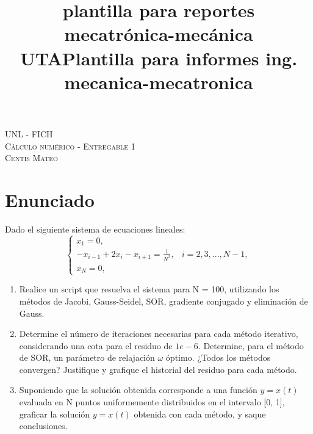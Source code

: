 \documentclass[11pt]{article}
\title{plantilla para reportes mecatrónica-mecánica UTA}
\title{Plantilla para informes ing. mecanica-mecatronica}
\begin{document}

\begin{center}																		%
	\newcommand{\HRule}{\rule{\linewidth}{0.5mm}}									%


	\vspace*{1.0cm}								%
	\textsc{\huge UNL - FICH \vspace{5px}}\\[1.5cm]

	\textsc{\LARGE Cálculo numérico - Entregable 1}\\[1.5cm]													%

	\textsc{\LARGE Centis Mateo}

\end{center}

\section*{Enunciado}
Dado el siguiente sistema de ecuaciones lineales:
\begin{equation*}
	\left\{
	\begin{array}{ll}
		x_1=0,                                                \\
		-x_{i-1}+2x_i-x_{i+1}=\frac{1}{N^2}, & i=2,3,...,N-1, \\
		x_N=0,
	\end{array}
	\right.
\end{equation*}
\begin{enumerate}
	\renewcommand{\theenumi}{\alph{enumi}} %
	\item Realice un script que resuelva el sistema para N = 100, utilizando los métodos de Jacobi,
	      Gauss-Seidel, SOR, gradiente conjugado y eliminación de Gauss.
	\item Determine el número de iteraciones necesarias para cada método iterativo, considerando una
	      cota para el residuo de $1e-6$. Determine, para el método de SOR, un parámetro de relajación
	      $\omega$ óptimo. ¿Todos los métodos convergen? Justifique y grafique el historial del residuo para
	      cada método.
	\item Suponiendo que la solución obtenida corresponde a una función $y=x(t)$ evaluada en N puntos
	      uniformemente distribuidos en el intervalo [0, 1], graficar la solución $y = x(t)$ obtenida con cada
	      método, y saque conclusiones.
\end{enumerate}
\end{document}
